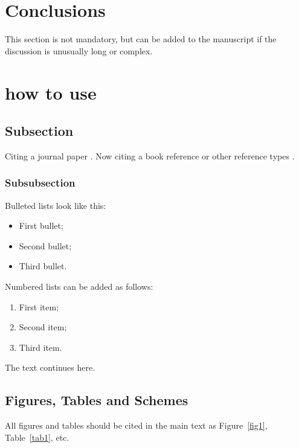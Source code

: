 \begin{paracol}{2}
\section{Conclusions}

This section is not mandatory, but can be added to the manuscript if the discussion is unusually long or complex.

\section{how to use}

\subsection{Subsection}
Citing a journal paper \cite{wagner2017optimization} . Now citing a book reference \cite{blair2005sam} or other reference types \cite{hirsch2011standardization}. \cite{nellis_klein_2008}
\subsubsection{Subsubsection}

Bulleted lists look like this:
\begin{itemize}
\item	First bullet;
\item	Second bullet;
\item	Third bullet.
\end{itemize}

Numbered lists can be added as follows:
\begin{enumerate}
\item	First item; 
\item	Second item;
\item	Third item.
\end{enumerate}

The text continues here. 

\subsection{Figures, Tables and Schemes}

All figures and tables should be cited in the main text as Figure~\ref{fig1}, Table~\ref{tab1}, etc.


\end{paracol}
